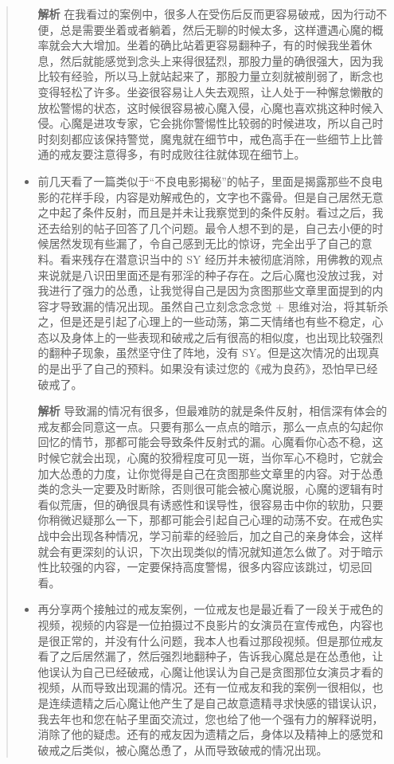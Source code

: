\begin{quotation}
\begin{itemize}
              \textbf{解析} 在我看过的案例中，很多人在受伤后反而更容易破戒，因为行动不便，总是需要坐着或者躺着，然后无聊的时候太多，这样遭遇心魔的概率就会大大增加。坐着的确比站着更容易翻种子，有的时候我坐着休息，然后就能感觉到念头上来得很猛烈，那股力量的确很强大，因为我比较有经验，所以马上就站起来了，那股力量立刻就被削弱了，断念也变得轻松了许多。坐姿很容易让人失去观照，让人处于一种懈怠懒散的放松警惕的状态，这时候很容易被心魔入侵，心魔也喜欢挑这种时候入侵。心魔是进攻专家，它会挑你警惕性比较弱的时候进攻，所以自己时时刻刻都应该保持警觉，魔鬼就在细节中，戒色高手在一些细节上比普通的戒友要注意得多，有时成败往往就体现在细节上。
        \item 前几天看了一篇类似于“不良电影揭秘”的帖子，里面是揭露那些不良电影的花样手段，内容是劝解戒色的，文字也不露骨。但是自己居然无意之中起了条件反射，而且是并未让我察觉到的条件反射。看过之后，我还去给别的帖子回答了几个问题。最令人想不到的是，自己去小便的时候居然发现有些漏了，令自己感到无比的惊讶，完全出乎了自己的意料。看来残存在潜意识当中的 SY 经历并未被彻底消除，用佛教的观点来说就是八识田里面还是有邪淫的种子存在。之后心魔也没放过我，对我进行了强力的怂恿，让我觉得自己是因为贪图那些文章里面提到的内容才导致漏的情况出现。虽然自己立刻念念念觉 + 思维对治，将其斩杀之，但是还是引起了心理上的一些动荡，第二天情绪也有些不稳定，心态以及身体上的一些表现和破戒之后有很高的相似度，也出现比较强烈的翻种子现象，虽然坚守住了阵地，没有 SY。但是这次情况的出现真的是出乎了自己的预料。如果没有读过您的《戒为良药》，恐怕早已经破戒了。

              \textbf{解析} 导致漏的情况有很多，但最难防的就是条件反射，相信深有体会的戒友都会同意这一点。只要有那么一点点的暗示，那么一点点的勾起你回忆的情节，那都可能会导致条件反射式的漏。心魔看你心态不稳，这时候它就会出现，心魔的狡猾程度可见一斑，当你军心不稳时，它就会加大怂恿的力度，让你觉得是自己在贪图那些文章里的内容。对于怂恿类的念头一定要及时断除，否则很可能会被心魔说服，心魔的逻辑有时看似荒唐，但的确很具有诱惑性和误导性，很容易击中你的软肋，只要你稍微迟疑那么一下，那都可能会引起自己心理的动荡不安。在戒色实战中会出现各种情况，学习前辈的经验后，加之自己的亲身体会，这样就会有更深刻的认识，下次出现类似的情况就知道怎么做了。对于暗示性比较强的内容，一定要保持高度警惕，很多内容应该跳过，切忌回看。
        \item 再分享两个接触过的戒友案例，一位戒友也是最近看了一段关于戒色的视频，视频的内容是一位拍摄过不良影片的女演员在宣传戒色，内容也是很正常的，并没有什么问题，我本人也看过那段视频。但是那位戒友看了之后居然漏了，然后强烈地翻种子，告诉我心魔总是在怂恿他，让他误认为自己已经破戒，心魔让他误认为自己是贪图那位女演员才看的视频，从而导致出现漏的情况。还有一位戒友和我的案例一很相似，也是连续遗精之后心魔让他产生了是自己故意遗精寻求快感的错误认识，我去年也和您在帖子里面交流过，您也给了他一个强有力的解释说明，消除了他的疑虑。还有的戒友因为遗精之后，身体以及精神上的感觉和破戒之后类似，被心魔怂恿了，从而导致破戒的情况出现。


\end{itemize}
\end{quotation}
